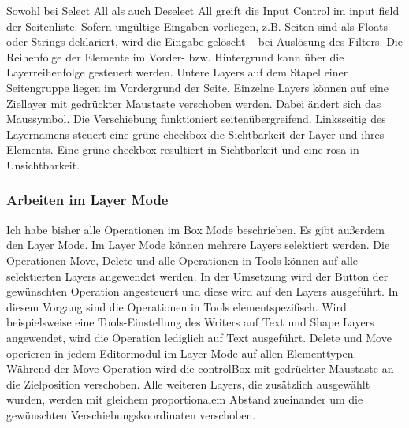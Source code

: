 Sowohl bei Select All als auch Deselect All greift die Input Control im input field der Seitenliste. Sofern ungültige Eingaben vorliegen, z.B. Seiten sind als Floats oder Strings deklariert, wird die Eingabe gelöscht – bei Auslösung des Filters. Die Reihenfolge der Elemente im Vorder- bzw. Hintergrund kann über die Layerreihenfolge gesteuert werden. Untere Layers auf dem Stapel einer Seitengruppe liegen im Vordergrund der Seite. Einzelne Layers können auf eine Ziellayer mit gedrückter Maustaste verschoben werden. Dabei ändert sich das Maussymbol. Die Verschiebung funktioniert seitenübergreifend. Linksseitig des Layernamens steuert eine grüne checkbox die Sichtbarkeit der Layer und ihres Elements. Eine grüne checkbox resultiert in Sichtbarkeit und eine rosa in Unsichtbarkeit. 

\subsubsection{Arbeiten im Layer Mode}
Ich habe bisher alle Operationen im Box Mode beschrieben. Es gibt außerdem den Layer Mode. Im Layer Mode können mehrere Layers selektiert werden. Die Operationen Move, Delete und alle Operationen in Tools können auf alle selektierten Layers angewendet werden. In der Umsetzung wird der Button der gewünschten Operation angesteuert und diese wird auf den Layers ausgeführt. In diesem Vorgang sind die Operationen in Tools elementspezifisch. Wird beispielsweise eine Tools-Einstellung des Writers auf Text und Shape Layers angewendet, wird die Operation lediglich auf Text ausgeführt. Delete und Move operieren in jedem Editormodul im Layer Mode auf allen Elementtypen. Während der Move-Operation wird die controlBox mit gedrückter Maustaste an die Zielposition verschoben. Alle weiteren Layers, die zusätzlich ausgewählt wurden, werden mit gleichem proportionalem Abstand zueinander um die gewünschten Verschiebungskoordinaten verschoben. 